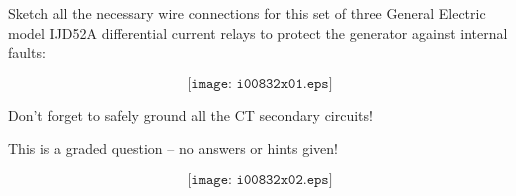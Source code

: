 

Sketch all the necessary wire connections for this set of three General Electric model IJD52A differential current relays to protect the generator against internal faults:

$$\texttt{[image: i00832x01.eps]}$$

Don't forget to safely ground all the CT secondary circuits!

\vfil 

\eject






This is a graded question -- no answers or hints given!







$$\texttt{[image: i00832x02.eps]}$$




